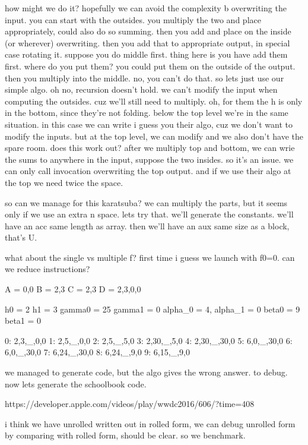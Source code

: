 how might we do it?
hopefully we can avoid the complexity b overwriting the input.
you can start with the outsides. you multiply the two and place appropriately, could also do so summing. then you add and place on the inside (or wherever) overwriting. then you add that to appropriate output, in special case rotating it. 
suppose you do middle first. thing here is you have add them first. where do you put them? you could put them on the outside of the output. then you multiply into the middle. no, you can't do that. so lets just use our simple algo.
oh no, recursion doesn't hold. we can't modify the input when computing the outsides. cuz we'll still need to multiply. 
oh, for them the h is only in the bottom, since they're not folding.
below the top level we're in the same situation. in this case we can write i guess you their algo, cuz we don't want to modify the inputs. but at the top level, we can modify and we also don't have the spare room. does this work out?
after we multiply top and bottom, we can wrie the sums to anywhere in the input, suppose the two insides. so it's an issue. we can only call invocation overwriting the top output. and if we use their algo at the top we need twice the space. 

so can we manage for this karatsuba?
we can multiply the parts, but it seems only if we use an extra n space.
lets try that. we'll generate the constants. we'll have an acc same length as array. then we'll have an aux same size as a block, that's U.

what about the single vs multiple f? first time i guess we launch with f0=0. can we reduce instructions?


A = 0,0
B = 2,3
C = 2,3
D = 2,3,0,0

h0 = 2
h1 = 3
gamma0 = 25
gamma1 = 0
alpha_0 = 4,
alpha_1 = 0
beta0 = 9
beta1 = 0

0: 2,3,_,0,0
1: 2,5,_,0,0
2: 2,5,_,5,0
3: 2,30,_,5,0
4: 2,30,_,30,0
5: 6,0,_,30,0
6: 6,0,_,30,0
7: 6,24,_,30,0
8: 6,24,_,9,0
9: 6,15,_,9,0

we managed to generate code, but the algo gives the wrong answer. to debug. 
now lets generate the schoolbook code. 













https://developer.apple.com/videos/play/wwdc2016/606/?time=408

i think we have unrolled written out in rolled form, we can debug unrolled form by comparing with rolled form, should be clear.
so we benchmark. 


